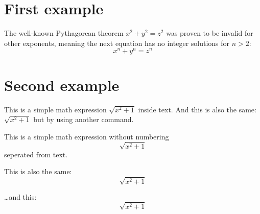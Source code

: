 \documentclass{article}
\begin{document}
\section{First example}

The well-known Pythagorean theorem $x^2 + y^2 = z^2$ was proven to be invalid
for other exponents, meaning the next equation has no integer solutions for 
$ n > 2$:
$$
    x^n + y^n = z^n
$$

\section{Second example}

This is a simple math expression $\sqrt{x^2 + 1}$ inside text. And this is also
the same:
\begin{math}
    \sqrt{x^2 + 1}
\end{math}
but by using another command.

This is a simple math expression without numbering
\[\sqrt{x^2 + 1}\]
seperated from text.

This is also the same:
\begin{displaymath}
    \sqrt{x^2 + 1}
\end{displaymath}

\ldots and this:
\begin{equation*}
    \sqrt{x^2 + 1}
\end{equation*}
\end{document}

